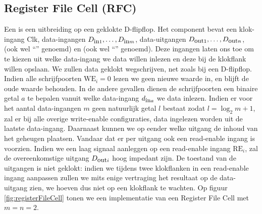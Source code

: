 \subsection{Register File Cell (RFC)}
Een  is een uitbreiding op een geklokte D-flipflop. Het component bevat een klok-ingang $\mbox{Clk}$, data-ingangen $D_{\mbox{\small{in}}1},\ldots,D_{\mbox{\small{in}}m}$, data-uitgangen $D_{\mbox{\small{out}}1},\ldots,D_{\mbox{\small{out}}n}$,  (ook wel ``'' genoemd) en  (ook wel ``'' genoemd). Deze ingangen laten ons toe om te kiezen uit welke data-ingang we data willen inlezen en deze bij de klokflank willen opslaan. We zullen data geklokt wegschrijven, net zoals bij een D-flipflop. Indien alle schrijfpoorten $\mbox{WE}_i=0$ lezen we geen nieuwe waarde in, en blijft de oude waarde behouden. In de andere gevallen dienen de schrijfpoorten een binaire getal $a$ te bepalen vanuit welke data-ingang $d_{\mbox{\small{in}}a}$ we data inlezen. Indien er voor het aantal data-ingangen $m$ geen natuurlijk getal $l$ bestaat zodat $l=\log_2 m+1$, zal er bij alle overige write-enable configuraties, data ingelezen worden uit de laatste data-ingang. Daarnaast kunnen we op eender welke uitgang de inhoud van het geheugen plaatsen. Vandaar dat er per uitgang ook een read-enable ingang is voorzien. Indien we een laag signaal aanleggen op een read-enable ingang $\mbox{RE}_i$, zal de overeenkomstige uitgang $D_{\mbox{\small{out}}i}$ hoog impedant zijn. De toestand van de uitgangen is niet geklokt: indien we tijdens twee klokflanken in een read-enable ingang aanpassen zullen we mits enige vertraging het resultaat op de data-uitgang zien, we hoeven dus niet op een klokflank te wachten. Op figuur \ref{fig:registerFileCell} tonen we een implementatie van een Register File Cell met $m=n=2$.
